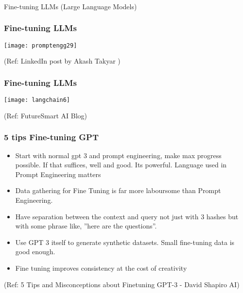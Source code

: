 \begin{frame}[fragile]\frametitle{}
\begin{center}
{\Large Fine-tuning LLMs (Large Language Models)}
\end{center}
\end{frame}

\begin{frame}[fragile]\frametitle{Fine-tuning LLMs}

\begin{center}
\texttt{[image: promptengg29]}

{\tiny (Ref: LinkedIn post by Akash Takyar )}

\end{center}		


\end{frame}

\begin{frame}[fragile]\frametitle{Fine-tuning LLMs}

\begin{center}
\texttt{[image: langchain6]}

{\tiny (Ref: FutureSmart AI Blog)}

\end{center}		


\end{frame}

\begin{frame}[fragile]\frametitle{5 tips Fine-tuning GPT}

\begin{itemize}
\item Start with normal gpt 3 and prompt engineering, make max progress possible. If that suffices, well and good. Its powerful. Language used in Prompt Engineering matters
\item Data gathering for Fine Tuning is far more laboursome than Prompt Engineering.
\item Have separation between the context and query not just with 3 hashes but with some phrase like, ''here are the questions''.
\item Use GPT 3 itself to generate synthetic datasets. Small fine-tuning data is good enough.
\item Fine tuning improves consistency at the cost of creativity
\end{itemize}	

{\tiny (Ref: 5 Tips and Misconceptions about Finetuning GPT-3 - David Shapiro AI)}


\end{frame}



